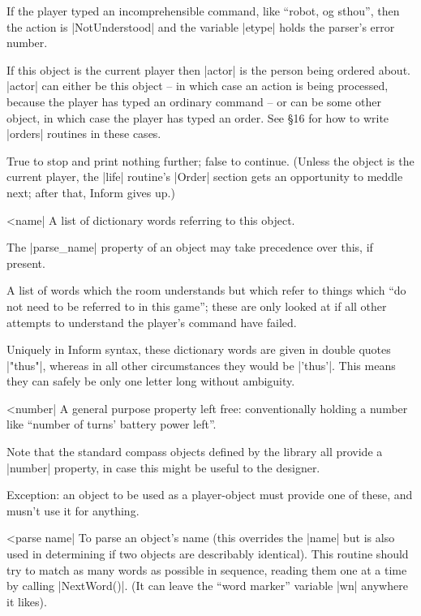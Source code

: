 \noindent If the player typed an incomprehensible command, like
``robot, og sthou'', then the action is |NotUnderstood| and the
variable |etype| holds the parser's error number.

\noindent If this object is the current player then |actor| is
the person being ordered about.  |actor| can either be this
object -- in which case an action is being processed, because
the player has typed an ordinary command -- or can be some other
object, in which case the player has typed an order.  See
\S 16 for how to write |orders| routines in these cases.

\rr True to stop and print nothing further; false to continue.
(Unless the object is the current player, the |life| routine's
|Order| section gets an opportunity to meddle next; after that,
Inform gives up.)

^^|name|
\fo A list of dictionary words referring to this object.

\warn The |parse_name| property of an object may take precedence over this,
if present.

\fr A list of words which the room understands but which refer to things
which ``do not need to be referred to in this game''; these are only looked
at if all other attempts to understand the player's command have failed.

\warn Uniquely in Inform syntax, these dictionary words are given in double
quotes |"thus"|, whereas in all other circumstances they would be |'thus'|. 
This means they can safely be only one letter long without ambiguity.

^^|number|
A general purpose property left free: conventionally holding a number like
``number of turns' battery power left''.

\fco Note that the standard compass objects defined by the library all
provide a |number| property, in case this might be useful to the designer.

\fpo Exception: an object to be used as a player-object must provide one of
these, and musn't use it for anything.

^^|parse name|
\fo To parse an object's name (this overrides the |name| but is also used in
determining if two objects are describably identical). This routine should
try to match as many words as possible in sequence, reading them one at a
time by calling |NextWord()|. (It can leave the ``word marker'' variable
|wn| anywhere it likes).

